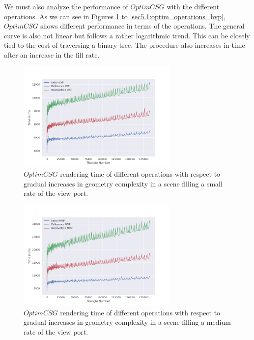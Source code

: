 \documentclass[a4paper,11pt,oneside]{article}
\begin{document}
We must also analyze the performance of $OptimCSG$ with the different operations. As we can see in Figures \ref{sec5.1:optim_operations_lvp} to \ref{sec5.1:optim_operations_hvp}, $OptimCSG$ shows different performance in terms of the operations. The general curve is also not linear but follows a rather logarithmic trend. This can be closely tied to the cost of traversing a binary tree. The procedure also increases in time after an increase in the fill rate.

\begin{figure}[H]
	\centering
	\includegraphics[width=0.7\textwidth]{section5/plots/optim_csg_lvp.png}
	\caption{$OptimCSG$ rendering time of different operations with respect to gradual increases in geometry complexity in a scene filling a small rate of the view port.}
	\label{sec5.1:optim_operations_lvp}
\end{figure}

\begin{figure}[H]
	\centering
	\includegraphics[width=0.7\textwidth]{section5/plots/optim_csg_mvp.png}
	\caption{$OptimCSG$ rendering time of different operations with respect to gradual increases in geometry complexity in a scene filling a medium rate of the view port.}
	\label{sec5.1:optim_operations_mvp}
\end{figure}
\end{document}

